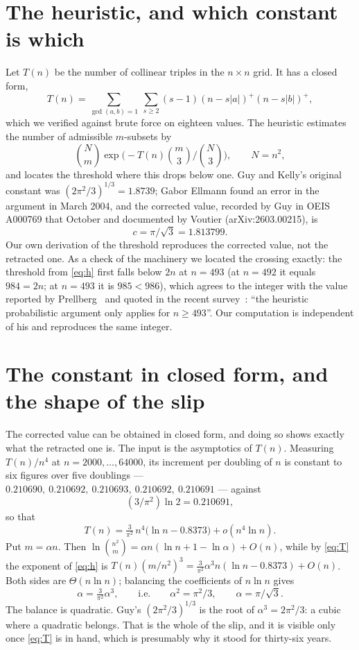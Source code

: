 \documentclass[11pt,a4paper]{article}
\begin{document}
\section{The heuristic, and which constant is which}
Let $T(n)$ be the number of collinear triples in the $n\times n$ grid.  It has a closed form,
\[T(n)=\sum_{\gcd(a,b)=1}\ \sum_{s\ge2}(s-1)(n-s|a|)^{+}(n-s|b|)^{+},\]
which we verified against brute force on eighteen values.  The heuristic estimates the number of
admissible $m$-subsets by
\begin{equation}\label{eq:h}
\binom{N}{m}\exp\!\Big(-T(n)\binom{m}{3}\Big/\binom{N}{3}\Big),\qquad N=n^2,
\end{equation}
and locates the threshold where this drops below one.  Guy and Kelly's original constant was
$(2\pi^2/3)^{1/3}=1.8739$; Gabor Ellmann found an error in the argument in March 2004, and the
corrected value, recorded by Guy in OEIS A000769 that October and documented by Voutier
(arXiv:2603.00215), is
\[c=\pi/\sqrt3=1.813799.\]
Our own derivation of the threshold reproduces the corrected value, not the retracted one.  As a
check of the machinery we located the crossing exactly: the threshold from \eqref{eq:h} first falls
below $2n$ at $n=493$ (at $n=492$ it equals $984=2n$; at $n=493$ it is $985<986$), which agrees to the
integer with the value reported by Prellberg~\cite{Prellberg} and quoted in the recent
survey~\cite{Survey}: ``the heuristic probabilistic argument only applies for $n\ge493$''.
Our computation is independent of his and reproduces the same integer.

\section{The constant in closed form, and the shape of the slip}
The corrected value can be obtained in closed form, and doing so shows exactly what the retracted
one is.  The input is the asymptotics of $T(n)$.  Measuring $T(n)/n^4$ at $n=2000,\dots,64000$, its
increment per doubling of $n$ is constant to six figures over five doublings ---
$0.210690,\ 0.210692,\ 0.210693,\ 0.210692,\ 0.210691$ --- against
\[(3/\pi^2)\ln 2=0.210691,\]
so that
\begin{equation}\label{eq:T}
T(n)=\tfrac{3}{\pi^2}\,n^4\big(\ln n-0.8373\big)+o(n^4\ln n).
\end{equation}
Put $m=\alpha n$.  Then $\ln\binom{n^2}{m}=\alpha n(\ln n+1-\ln\alpha)+O(n)$, while by \eqref{eq:T}
the exponent of \eqref{eq:h} is $T(n)(m/n^2)^3=\tfrac{3}{\pi^2}\alpha^3 n(\ln n-0.8373)+O(n)$.
Both sides are $\Theta(n\ln n)$; balancing the coefficients of $n\ln n$ gives
\[\alpha=\tfrac{3}{\pi^2}\alpha^3,\qquad\text{i.e.}\qquad \alpha^2=\pi^2/3,\qquad \alpha=\pi/\sqrt3 .\]
The balance is quadratic.  Guy's $(2\pi^2/3)^{1/3}$ is the root of $\alpha^3=2\pi^2/3$: a cubic
where a quadratic belongs.  That is the whole of the slip, and it is visible only once
\eqref{eq:T} is in hand, which is presumably why it stood for thirty-six years.
\end{document}
